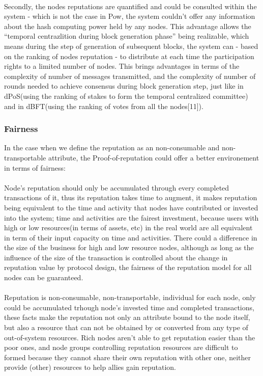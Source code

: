 \documentclass[doublespacing]{bmcart}
\begin{document}
\begin{CJK*}{UTF8}{gbsn}
\paragraph{} 
Secondly, the nodes reputations are quantified and could be consulted within the system - which is not the case in Pow, the system couldn't offer any information about the hash computing power held by any nodes. This advantage allows the ``temporal centrazlition during block generation phase'' being realizable, which means during the step of generation of subsequent blocks, the system can - based on the ranking of nodes reputation - to distribute at each time the participation rights to a limited number of nodes. This brings advantages in terms of the complexity of number of messages transmitted, and the complexity of number of rounds needed to achieve consensus during block generation step, just like in dPoS(using the ranking of stakes to form the temporal centralized committee) and in dBFT(using the ranking of votes from all the nodes[11]). 
\subsubsection*{Fairness}
In the case when we define the reputation as an non-consumable and non-transportable attribute, the Proof-of-reputation could offer a better environement in terms of fairness: 
\paragraph{} Node's reputation should only be accumulated through every completed transactions of it, thus its reputation takes time to augment, it makes reputation being equivalent to the time and activity that nodes have contributed or invested into the system; time and activities are the fairest investment, because users with high or low resources(in terms of assets, etc) in the real world are all equivalent in term of their input capacity on time and activities. There could a difference in the size of the business for high and low resource nodes, although as long as the influence of the size of the transaction is controlled about the change in reputation value by protocol design, the fairness of the reputation model for all nodes can be guaranteed.
\paragraph{} Reputation is non-consumable, non-transportable, individual for each node, only could be accumulated trhough node's invested time and completed transactions, these facts make the reputation not only an attribute bound to the node itself, but also a resource that can not be obtained by or converted from any type of out-of-system resources. Rich nodes aren't able to get reputation easier than the poor ones, and node groups controlling reputation resources are difficult to formed because they cannot share their own reputation with other one, neither provide (other) resources to help allies gain reputation. 

\end{CJK*}
\end{document}
